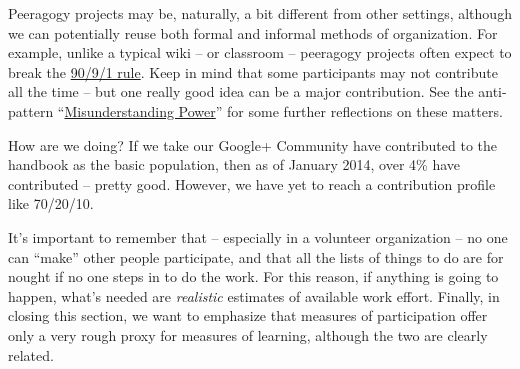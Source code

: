 Peeragogy projects may be, naturally, a bit different from other
settings, although we can potentially reuse both formal and informal
methods of organization. For example, unlike a typical wiki -- or
classroom -- peeragogy projects often expect to break the
\href{http://en.wikipedia.org/wiki/1\%25\_rule\_\%28Internet\_culture\%29}{90/9/1
rule}. Keep in mind that some participants may not contribute all the
time -- but one really good idea can be a major contribution. See the
anti-pattern
``\href{http://peeragogy.org/practice/antipatterns/misunderstanding-power/}{Misunderstanding
Power}'' for some further reflections on these matters.

How are we doing? If we take our Google+ Community have contributed to
the handbook as the basic population, then as of January 2014, over
4\% have contributed -- pretty good.  However, we have yet to reach a
contribution profile like 70/20/10.

It's important to remember that -- especially in a volunteer
organization -- no one can ``make'' other people participate, and that
all the lists of things to do are for nought if no one steps in to do
the work.  For this reason, if anything is going to happen, what's
needed are \emph{realistic} estimates of available work effort.
Finally, in closing this section, we want to emphasize that measures
of participation offer only a very rough proxy for measures of
learning, although the two are clearly related.
